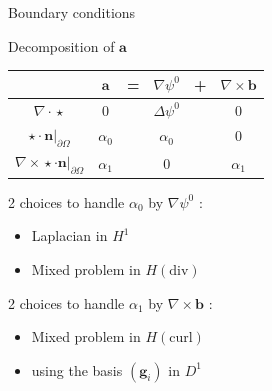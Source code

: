 \documentclass{beamer}
\newcommand{\grad}{{\nabla}}
\newcommand{\laplace}{{\Delta}}
\newcommand{\curl}{{\nabla\times}}
\renewcommand{\div}{{\nabla\cdot}}
\newcommand{\restr}{{\big\rvert_{\partial\Omega}}}
\newcommand{\tailleg}{0.7}
\begin{document}
\begin{frame}
\begin{columns}[onlytextwidth]
\begin{column}{0.65\textwidth}
    \end{column}
  \end{columns}
\end{frame}
  
\begin{frame}{Boundary conditions}
\label{psi0}
\begin{block}{Decomposition of $\mathbf{a}$}
\begin{center}
\begin{tabular}{c|ccccc}
& $\mathbf{a}$ & = & $\grad\psi^0$ & + & $\curl \mathbf{b}$ \\ \hline
$\div\star$ & 0 & & $\laplace\psi^0$ & & 0\\ \hline
$\star\cdot \mathbf{n}\restr$ & $\alpha_0$ & & $\alpha_0$ & & 0\\ \hline
$\curl\star\cdot \mathbf{n}\restr$ & $\alpha_1$ & & 0 & & $\alpha_1$
\end{tabular}
\end{center}
\end{block}
2 choices to handle $\alpha_0$ by $\grad\psi^0$ :
\begin{itemize}
\item Laplacian in $H^1$
\item Mixed problem in $H(\mathrm{div})$
\end{itemize}
2 choices to handle $\alpha_1$ by $\curl\mathbf{b}$ :
\begin{itemize}
\item Mixed problem in $H(\mathrm{curl})$
\item using the basis $(\mathbf{g}_i)$ in $D^1$
\end{itemize}
\end{frame}
\end{document}
